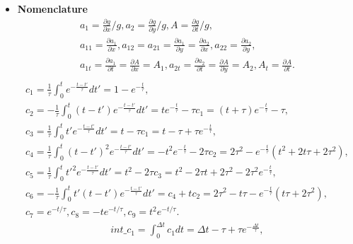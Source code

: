 \documentclass[review]{elsarticle}
\begin{document}
\begin{itemize}
	\item \textbf{Nomenclature}
	\begin{equation}\label{Nomenclature1}
	\begin{gathered}
		a_1 = \frac{\partial g}{\partial x}/g, a_2 = \frac{\partial g}{\partial y}/g, 
		A=\frac{\partial g}{\partial t}/g,\\
		a_{11} = \frac{\partial a_1}{\partial x}, 
		a_{12} = a_{21} = \frac{\partial a_1}{\partial y} = \frac{\partial a_2}{\partial x}, 
		a_{22} = \frac{\partial a_2}{\partial y},\\
		a_{1t} = \frac{\partial a_1}{\partial t} = \frac{\partial A}{\partial x}=A_1, 
		a_{2t} = \frac{\partial a_2}{\partial t} = \frac{\partial A}{\partial y}=A_2, 
		A_t=\frac{\partial A}{\partial t}.\\
	\end{gathered}
	\end{equation}
	\begin{equation}\label{Nomenclature2}
	\begin{gathered}
		c_1=\frac{1}{\tau}\int_{0}^{t}e^{-\frac{t-t'}{\tau}}dt'=1-e^{-\frac{t}{\tau}},\\
		c_2=-\frac{1}{\tau}\int_{0}^{t}\left(t-t'\right)e^{-\frac{t-t'}{\tau}}dt'
		=te^{-\frac{t}{\tau}}-\tau c_1=\left(t+\tau\right)e^{-\frac{t}{\tau}}-\tau,\\
		c_3=\frac{1}{\tau}\int_{0}^{t}t'e^{-\frac{t-t'}{\tau}}dt'
		=t-\tau c_1=t-\tau +\tau e^{-\frac{t}{\tau}},\\
		c_4=\frac{1}{\tau}\int_{0}^{t}\left(t-t'\right)^2e^{-\frac{t-t'}{\tau}}dt'
		=-t^2e^{-\frac{t}{\tau}}-2\tau c_2=2\tau^2-e^{-\frac{t}{\tau}}\left(t^2+2t\tau+2\tau^2\right),\\
		c_5=\frac{1}{\tau}\int_{0}^{t}t'^2e^{-\frac{t-t'}{\tau}}dt'
		=t^2-2\tau c_3=t^2-2\tau t+2\tau^2-2\tau^2e^{-\frac{t}{\tau}},\\
		c_6=-\frac{1}{\tau}\int_{0}^{t}t'\left(t-t'\right)e^{-\frac{t-t'}{\tau}}dt'
		=c_4+tc_2=2\tau^2-t\tau-e^{-\frac{t}{\tau}}\left(t\tau+2\tau^2\right),\\
		c_7 = e^{-t/\tau}, c_8=-te^{-t/\tau}, c_9=t^2e^{-t/\tau}.
	\end{gathered}
	\end{equation}
	\begin{equation}\label{Nomenclature3}
	\begin{gathered}
		int\_c_1=\int_{0}^{\Delta t} c_1dt=\Delta{t} - \tau + \tau e^{- \frac{\Delta{t}}{\tau}},\\

\end{gathered}
\end{equation}
\end{itemize}
\end{document}
